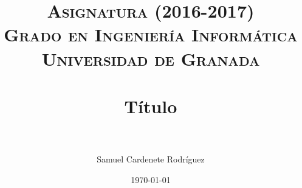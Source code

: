 





\title{	
\normalfont \normalsize 
\textsc{\textbf{Asignatura (2016-2017)} \\ Grado en Ingeniería Informática \\ Universidad de Granada} \\ [25pt] %
\horrule{0.5pt} \\[0.4cm] %
\huge Título \\ %
\horrule{2pt} \\[0.5cm] %
}

\author{Samuel Cardenete Rodríguez} %

\date{\normalsize\today} %




\maketitle %

\newpage %

\tableofcontents %

\listoffigures

\listoftables

\newpage



\begin{comment}


\begin{lstlisting}[language=bash, style=customc]
warehouses=4
loadWorkers=4
terminals=1
//To run specified transactions per terminal- runMins must equal zero
runTxnsPerTerminal=0
//To run for specified minutes- runTxnsPerTerminal must equal zero
runMins=10
//Number of total transactions per minute
limitTxnsPerMin=300

//Set to true to run in 4.x compatible mode. Set to false to use the
//entire configured database evenly.
terminalWarehouseFixed=true
\end{lstlisting}

\end{comment}


